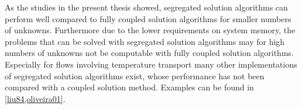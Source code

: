 As the studies in the present thesis showed, segregated solution algorithms can perform well compared to fully coupled solution algorithms for smaller numbers of unknowns. Furthermore due to the lower requirements on system memory, the problems that can be solved with segregated solution algorithms may for high numbers of unknowns not be computable with fully coupled solution algorithms. Especially for flows involving temperature transport many other implementations of segregated solution algorithms exist, whose performance has not been compared with a coupled solution method. Examples can be found in \ref{liu84,oliveira01}.

